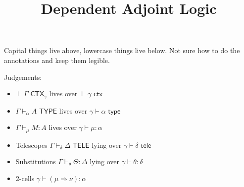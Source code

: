 \documentclass[10pt]{article}
\title{Dependent Adjoint Logic}
\author{}
\date{}
\newcommand{\yields}{\vdash}
\newcommand{\CTX}{\,\,\mathsf{CTX}}
\newcommand{\ctx}{\,\,\mathsf{ctx}}
\newcommand{\TYPE}{\,\,\mathsf{TYPE}}
\newcommand{\type}{\,\,\mathsf{type}}
\newcommand{\TELE}{\,\,\mathsf{TELE}}
\newcommand{\tele}{\,\,\mathsf{tele}}
\begin{document}
\maketitle

Capital things live above, lowercase things live below. Not sure how to do the annotations and keep them legible.

Judgements: 
\begin{itemize}
\item $\yields \Gamma \CTX_\gamma$ lives over $\yields \gamma \ctx$
\item $\Gamma \yields_\alpha A \TYPE$ lives over $\gamma \yields \alpha \type$
\item $\Gamma \yields_\mu M : A$ lives over $\gamma \yields \mu : \alpha$
\item Telescopes $\Gamma \yields_\delta \Delta \TELE$ lying over $\gamma \yields \delta \tele$
\item Substitutions $\Gamma \yields_\theta \Theta : \Delta$ lying over $\gamma \yields \theta : \delta$
\item 2-cells $\gamma \yields (\mu \Rightarrow \nu) : \alpha$
\end{itemize}
\end{document}
